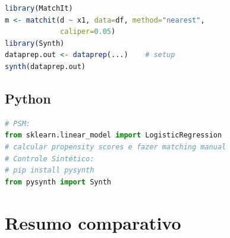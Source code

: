 \begin{lstlisting}[language=R, basicstyle=\ttfamily\small,
  frame=single, numbers=none, backgroundcolor=\color{codbg},
  keywordstyle=\color{keyword}\bfseries,
  stringstyle=\color{string},
  commentstyle=\color{comment}\itshape]
library(MatchIt)
m <- matchit(d ~ x1, data=df, method="nearest",
             caliper=0.05)
library(Synth)
dataprep.out <- dataprep(...)    # setup
synth(dataprep.out)
\end{lstlisting}

\subsection*{Python}

\begin{lstlisting}[language=Python, basicstyle=\ttfamily\small,
  frame=single, numbers=none, backgroundcolor=\color{codbg},
  keywordstyle=\color{keyword}\bfseries,
  stringstyle=\color{string},
  commentstyle=\color{comment}\itshape]
# PSM:
from sklearn.linear_model import LogisticRegression
# calcular propensity scores e fazer matching manual
# Controle Sintético:
# pip install pysynth
from pysynth import Synth
\end{lstlisting}

\section{Resumo comparativo}

